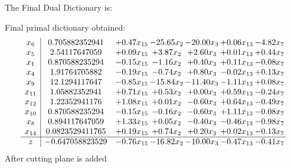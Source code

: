 \documentclass[8pt]{article}
\begin{document}
The Final Dual Dictionary is: 

 Final primal dictionary obtained: 
\[\begin{array}{c| c c@{\hskip 2pt} c@{\hskip 2pt} c@{\hskip 2pt} c@{\hskip 2pt} c@{\hskip 2pt} }
 x_{6}   &  0.705882352941 & +  0.47 x_{15} & -25.65 x_{2} & -20.00 x_{3} & +  0.06 x_{13} & -4.82 x_{7}\\
 x_{5}   &  2.54117647059 & +  0.09 x_{15} & +  3.87 x_{2} & +  2.60 x_{3} & +  0.01 x_{13} & +  0.44 x_{7}\\
 x_{1}   &  0.870588235294 & -0.15 x_{15} & -1.16 x_{2} & +  0.40 x_{3} & +  0.11 x_{13} & -0.08 x_{7}\\
 x_{4}   &  1.91764705882 & -0.19 x_{15} & -0.74 x_{2} & +  0.80 x_{3} & -0.02 x_{13} & +  0.13 x_{7}\\
 x_{9}   &  12.1294117647 & -0.85 x_{15} & -15.84 x_{2} & -11.40 x_{3} & -1.11 x_{13} & +  0.08 x_{7}\\
 x_{11}   &  1.05882352941 & +  0.71 x_{15} & +  0.53 x_{2} & +  0.00 x_{3} & +  0.59 x_{13} & -0.24 x_{7}\\
 x_{12}   &  1.22352941176 & +  1.08 x_{15} & +  0.01 x_{2} & -0.60 x_{3} & +  0.64 x_{13} & -0.49 x_{7}\\
 x_{10}   &  0.870588235294 & -0.15 x_{15} & -0.16 x_{2} & -0.60 x_{3} & +  1.11 x_{13} & -0.08 x_{7}\\
 x_{8}   &  0.894117647059 & +  1.33 x_{15} & +  0.05 x_{2} & -0.40 x_{3} & -0.46 x_{13} & -0.98 x_{7}\\
 x_{14}   &  0.0823529411765 & +  0.19 x_{15} & +  0.74 x_{2} & +  0.20 x_{3} & +  0.02 x_{13} & -0.13 x_{7}\\
\hline
z    &  -0.647058823529 & -0.76 x_{15} & -16.82 x_{2} & -10.00 x_{3} & -0.47 x_{13} & -0.41 x_{7}\\
\end{array}\]
 After cutting plane is added 
\end{document}
